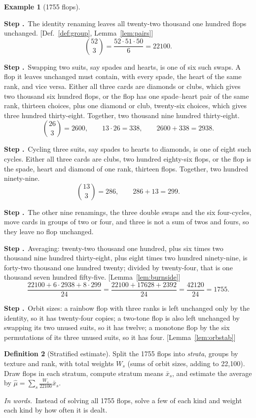 \documentclass[11pt]{article}
\theoremstyle{definition}
\newtheorem{definition}{Definition}[section]
\newtheorem{example}[definition]{Example}
\newcommand{\inwords}{\par\smallskip\noindent\textit{In words.}\ }
\newcounter{stp}
\newcommand{\steps}{\setcounter{stp}{0}}
\newcommand{\st}{\stepcounter{stp}\par\medskip\noindent\textbf{Step \arabic{stp}.}\ }
\newcommand{\by}[1]{\hfill{\small\color{blue!50!black}[#1]}}
\newcommand{\Def}[1]{Def.~\ref{#1}}\newcommand{\Lem}[1]{Lemma~\ref{#1}}\newcommand{\Thm}[1]{Thm.~\ref{#1}}
\begin{document}
\begin{example}[1755 flops]\label{ex:burnside}
\steps
\st The identity renaming leaves all twenty-two thousand one hundred flops unchanged. \by{\Def{def:group}, \Lem{lem:pairs}}
\[ \binom{52}3=\frac{52\cdot51\cdot50}{6}=22100. \]
\st Swapping two suits, say spades and hearts, is one of six such swaps. A flop it leaves unchanged must contain, with
every spade, the heart of the same rank, and vice versa. Either all three cards are diamonds or clubs, which gives two
thousand six hundred flops, or the flop has one spade--heart pair of the same rank, thirteen choices, plus one diamond or
club, twenty-six choices, which gives three hundred thirty-eight. Together, two thousand nine hundred thirty-eight.
\[ \binom{26}3=2600,\qquad13\cdot26=338,\qquad2600+338=2938. \]
\st Cycling three suits, say spades to hearts to diamonds, is one of eight such cycles. Either all three cards are clubs,
two hundred eighty-six flops, or the flop is the spade, heart and diamond of one rank, thirteen flops. Together, two
hundred ninety-nine.
\[ \binom{13}3=286,\qquad286+13=299. \]
\st The other nine renamings, the three double swaps and the six four-cycles, move cards in groups of two or four, and
three is not a sum of twos and fours, so they leave no flop unchanged.
\st Averaging: twenty-two thousand one hundred, plus six times two thousand nine hundred thirty-eight, plus eight times two
hundred ninety-nine, is forty-two thousand one hundred twenty; divided by twenty-four, that is one thousand seven hundred
fifty-five. \by{\Lem{lem:burnside}}
\[ \frac{22100+6\cdot2938+8\cdot299}{24}=\frac{22100+17628+2392}{24}=\frac{42120}{24}=1755. \]
\st Orbit sizes: a rainbow flop with three ranks is left unchanged only by the identity, so it has twenty-four copies; a
two-tone flop is also left unchanged by swapping its two unused suits, so it has twelve; a monotone flop by the six
permutations of its three unused suits, so it has four. \by{\Lem{lem:orbstab}}
\end{example}

\begin{definition}[Stratified estimate]\label{def:strat}
Split the 1755 flops into \emph{strata}, groups by texture and rank, with total weights $W_s$ (sums of orbit sizes, adding to
22{,}100). Draw flops in each stratum, compute stratum means $\bar x_s$, and estimate the average by
$\hat\mu=\sum_s\frac{W_s}{22100}\bar x_s$.
\inwords Instead of solving all 1755 flops, solve a few of each kind and weight each kind by how often it is dealt.
\end{definition}
\end{document}
